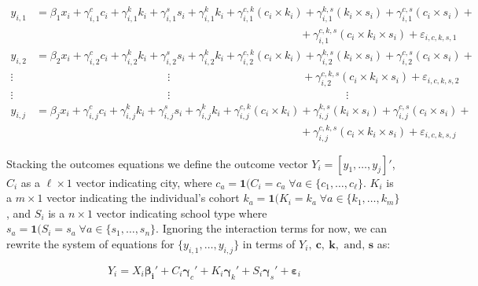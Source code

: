 \documentclass[10pt]{article}
\begin{document}
\begin{subequations}
\begin{align}
y_{i,1} & = \beta_{1}x_i  + \gamma^c_{i,1} c_i + \gamma^k_{i,1} k_i + \gamma^s_{i,1} s_i + \gamma^k_{i,1} k_i + \gamma^{c,k}_{i,1} (c_i \times k_i) + \gamma^{k,s}_{i,1} (k_i \times s_i) + \gamma^{c,s}_{i,1} (c_i \times s_i) + \\
&\qquad \qquad \qquad \qquad \qquad \qquad \qquad \qquad \qquad \qquad \qquad \qquad +\gamma^{c,k,s}_{i,1} (c_i \times k_i \times s_i) + \varepsilon_{i,c,k,s,1}  \nonumber \\
y_{i,2} & = \beta_{2}x_i  + \gamma^c_{i,2} c_i + \gamma^k_{i,2} k_i + \gamma^s_{i,2} s_i + \gamma^k_{i,2} k_i + \gamma^{c,k}_{i,2} (c_i \times k_i) + \gamma^{k,s}_{i,2} (k_i \times s_i) + \gamma^{c,s}_{i,2} (c_i \times s_i) + \\
\vdots & \qquad \qquad \qquad \qquad \qquad \qquad \vdots \qquad \qquad \qquad \qquad \qquad \qquad +\gamma^{c,k,s}_{i,2} (c_i \times k_i \times s_i) + \varepsilon_{i,c,k,s,2}  \nonumber \\
\vdots & \qquad \qquad \qquad \qquad \qquad \qquad \vdots \qquad \qquad \qquad \qquad \qquad \qquad \qquad \qquad \vdots  \nonumber \\
y_{i,j} & = \beta_{j}x_i + \gamma^c_{i,j} c_i + \gamma^k_{i,j} k_i + \gamma^s_{i,j} s_i + \gamma^k_{i,j} k_i + \gamma^{c,k}_{i,j} (c_i \times k_i) + \gamma^{k,s}_{i,j} (k_i \times s_i) + \gamma^{c,s}_{i,j} (c_i \times s_i) + \\
& \qquad \qquad \qquad \qquad \qquad \qquad \qquad \qquad \qquad \qquad \qquad \qquad +\gamma^{c,k,s}_{i,j} (c_i \times k_i \times s_i) + \varepsilon_{i,c,k,s,j}  \nonumber
\end{align}
\end{subequations}

Stacking the outcomes equations we define the outcome vector $Y_i = [y_1, \dots , y_j]'$, $C_i$ as a $\ell \times 1$ vector indicating city, where $c_{a} = \mathbf{1}(C_i = c_a\; \forall a \in \{c_1, \dots, c_{\ell} \}$. $K_i$ is a $m \times 1$ vector indicating the individual's cohort $k_a = \mathbf{1}(K_i = k_a\; \forall a \in \{k_1, \dots, k_{m} \}$, and  $S_i$ is a $n \times 1$ vector indicating school type where $s_a = \mathbf{1}(S_i = s_a\; \forall a \in \{s_1, \dots, s_{n} \}$.  Ignoring the interaction terms for now, we can rewrite the system of equations for $\{y_{i,1}, \dots, y_{i,j}\}$ in terms of $Y_i,\ \mathbf{c},\ \mathbf{k}, \text{ and, } \mathbf{s}$ as: 

\begin{equation} \label{fixed}
Y_i = X_i \boldsymbol{\beta_i}' + C_i \boldsymbol{\gamma}_c' + K_i \boldsymbol{\gamma}_k' + S_i \boldsymbol{\gamma}_s'  + \boldsymbol{\varepsilon}_{i}
\end{equation}
\end{document}
